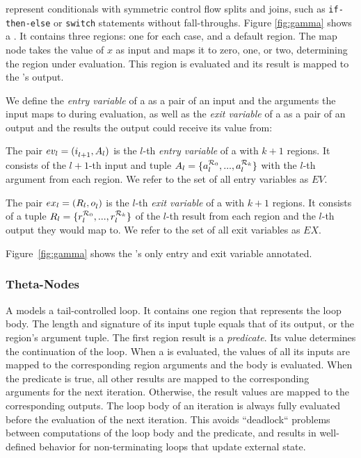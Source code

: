 \gammanodes represent conditionals with symmetric control flow splits and
joins, such as \verb;if-then-else; or \verb;switch; statements without fall-throughs. Figure
\ref{fig:gamma} shows a \gammanode. It contains three regions: one for each case, and a default
region. The map node takes the value of $x$ as input and maps it to zero, one, or two, determining
the region under evaluation. This region is evaluated and its result is mapped
to the \gammanode's output.

We define the \emph{entry variable} of a \gammanode as a pair of an input and the arguments the
input maps to during evaluation, as well as the \emph{exit variable} of a \gammanode as a pair of
an output and the results the output could receive its value from:

\begin{definition}
The pair $ev_{l} = (\mbox{$i_{l+1}^{}$}, A_{l})$ is the $l$-th \emph{entry variable} of a \gammanode with
$k+1$ regions. It consists of the $l+1$-th input and tuple $A_{l} = \{a^{{\mathcal R}_0}_{l}, ...,
a^{{\mathcal R}_k}_{l}\}$ with the $l$-th argument from each region. We refer to the set of all
entry variables as $EV$.
\end{definition}

\begin{definition}
The pair $ex_{l} = (R_l, \mbox{$o_{l}^{}$})$ is the $l$-th \emph{exit variable} of a \gammanode with $k+1$
regions. It consists of a tuple $R_l = \{r^{{\mathcal R}_0}_l, ...,r^{{\mathcal R}_k}_l\}$ of the $l$-th
result from each region and the $l$-th output they would map to. We refer to the set of all exit
variables as $EX$.
\end{definition}

Figure~\ref{fig:gamma} shows the \gammanode's only entry and exit variable annotated.

\subsubsection{Theta-Nodes}
A \thetanode models a tail-controlled loop. It contains one
region that represents the loop body. The length and signature of its input tuple equals that of
its output, or the region's argument tuple. The first region result is a \emph{predicate}.
Its value determines the continuation of the loop. When a \thetanode is evaluated, the values of
all its inputs are mapped to the corresponding region arguments and the body is evaluated. When
the predicate is true, all other results are mapped to the corresponding arguments for the next
iteration. Otherwise, the result values are mapped to the corresponding outputs. The loop
body of an iteration is always fully evaluated before the evaluation of the next iteration.
This avoids ``deadlock`` problems between computations of the loop body and the predicate, and
results in well-defined behavior for non-terminating loops that update external state.

